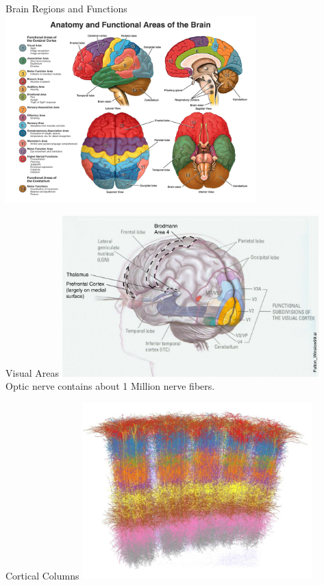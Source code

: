 \documentclass[serif,xcolor=pdftex,dvipsnames,table,hyperref={bookmarks=false}]{beamer}
\begin{document}
\begin{frame}[t]{Brain Regions and Functions}
\center
\includegraphics[width=3.8in]{../Figures/neuroanatomy.jpg}
\end{frame}

\begin{frame}[t]{Visual Areas}
\center
\includegraphics[width=3.9in]{../Figures/visual_areas.jpg}\\
\pause Optic nerve contains about 1 Million nerve fibers.
\end{frame}

\begin{frame}[t]{Cortical Columns}
\center
\includegraphics[width=3.5in]{../Figures/cortical_columns.jpg}
\end{frame}
\end{document}
